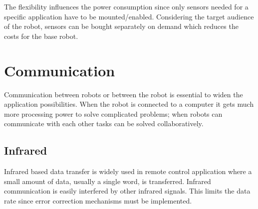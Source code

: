 The flexibility influences the power consumption since only sensors needed for a specific application have to be mounted/enabled. Considering the target audience of the robot, sensors can be bought separately on demand which reduces the costs for the base robot.
\section{Communication}
Communication between robots or between the robot is essential to widen the application possibilities. When the robot is connected to a computer it gets much more processing power to solve complicated problems; when robots can communicate with each other tasks can be solved collaboratively.

\subsection{Infrared}
Infrared based data transfer is widely used in remote control application where a small amount of data, usually a single word, is transferred. Infrared communication is easily interfered by other infrared signals. This limits the data rate since error correction mechanisms must be implemented.

